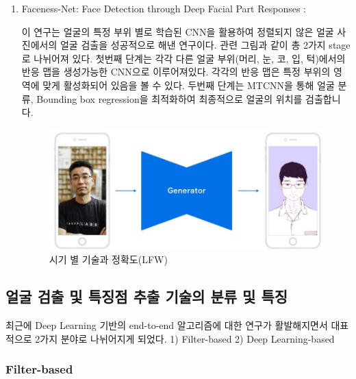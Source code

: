 \documentclass{oblivoir}
\begin{document}
\begin{enumerate}
    \item Faceness-Net: Face Detection through Deep Facial Part Responses : 

    이 연구는 얼굴의 특정 부위 별로 학습된 CNN을 활용하여 정렬되지 않은 얼굴 사진에서의 얼굴 검출을 성공적으로 해낸 연구이다. 
    관련 그림과 같이 총 2가지 stage로 나뉘어져 있다. 첫번째 단계는 각각 다른 얼굴 부위(머리, 눈, 코, 입, 턱)에서의 반응 맵을 생성가능한 CNN으로 이루어져있다. 
    각각의 반응 맵은 특정 부위의 영역에 맞게 활성화되어 있음을 볼 수 있다. 
    두번째 단계는 MTCNN을 통해 얼굴 분류, Bounding box regression을 최적화하여 최종적으로 얼굴의 위치를 검출합니다. 

    \begin{figure}[h!]
        \centering
        \includegraphics{pic/chp1/img593}
        \caption{시기 별 기술과 정확도(LFW)\cite{reference6}}
    \end{figure}

\end{enumerate}

\subsection{ 얼굴 검출 및 특징점 추출 기술의 분류 및 특징 }

최근에 Deep Learning 기반의 end-to-end 알고리즘에 대한 연구가 활발해지면서 대표적으로 2가지 분야로 나뉘어지게 되었다. 1) Filter-based 2) Deep Learning-based

\subsubsection{Filter-based}
\end{document}
